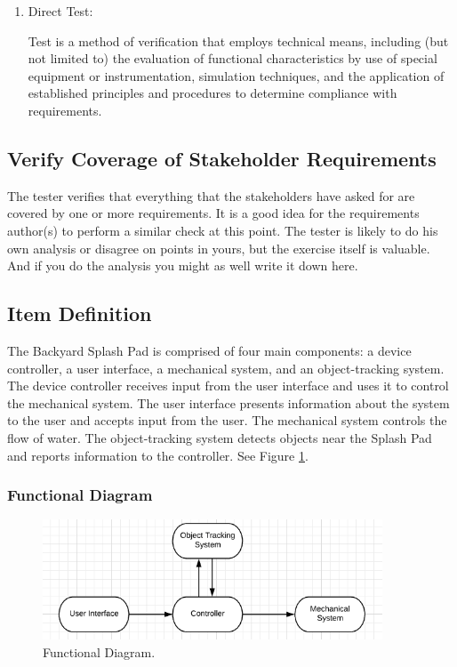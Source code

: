 \begin{slshape}
\begin{enumerate}
		\item Direct Test:

	Test is a method of verification that employs technical means, including (but not 
	limited to) the evaluation of functional characteristics by use of special equipment
	or instrumentation, simulation techniques, and the application of established 
	principles and procedures to determine compliance with requirements.
			
	\end{enumerate}		
	
\end{slshape}

\subsection{Verify Coverage of Stakeholder Requirements}

\begin{slshape}
\color{blue}
The tester verifies that everything that the stakeholders have asked for are covered by one or more requirements.  It is a good idea for the requirements author(s) to perform a similar check at this point.  The tester is likely to do his own analysis or disagree on points in yours, but the exercise itself is valuable. And if you do the analysis you might as well write it down here.   
\end{slshape}


\subsection{Item Definition} 
The Backyard Splash Pad is comprised of four main components: a device controller, a user interface, a mechanical system, and an object-tracking system. 
The device controller receives input from the user interface and uses it to control the mechanical system.
The user interface presents information about the system to the user and accepts input from the user.
The mechanical system controls the flow of water. 
The object-tracking system detects objects near the Splash Pad and reports information to the controller. 
See Figure \ref{fig:functional_diagram}.

\subsubsection{Functional Diagram}

\begin{figure}[h]
\centering
\includegraphics[width=0.9\textwidth]{Functional_Diagram.png}
\caption{\label{fig:functional_diagram}Functional Diagram.}
\end{figure}




